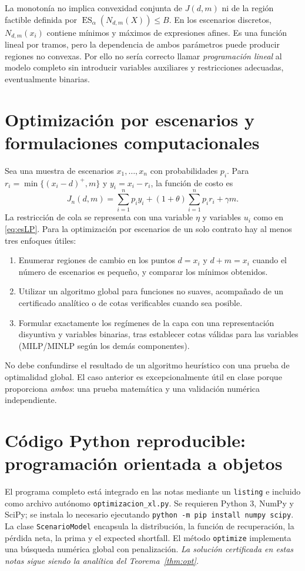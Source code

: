 \documentclass[11pt,reqno]{amsart}
\theoremstyle{definition}\newtheorem{definition}[theorem]{Definición}
\theoremstyle{remark}\newtheorem{remark}[theorem]{Observación}
\DeclareMathOperator{\ES}{ES}
\newcommand{\pos}[1]{(#1)^+}
\begin{document}
La monotonía no implica convexidad conjunta de $J(d,m)$ ni de la región factible definida por $\ES_\alpha(N_{d,m}(X))\le B$. En los escenarios discretos, $N_{d,m}(x_i)$ contiene mínimos y máximos de expresiones afines. Es una función lineal por tramos, pero la dependencia de ambos parámetros puede producir regiones no convexas. Por ello no sería correcto llamar \emph{programación lineal} al modelo completo sin introducir variables auxiliares y restricciones adecuadas, eventualmente binarias.

\section{Optimización por escenarios y formulaciones computacionales}
Sea una muestra de escenarios $x_1,\ldots,x_n$ con probabilidades $p_i$. Para $r_i=\min\{\pos{x_i-d},m\}$ y $y_i=x_i-r_i$, la función de costo es
\begin{equation}
J_n(d,m)=\sum_{i=1}^n p_i y_i+(1+\theta)\sum_{i=1}^n p_i r_i+\gamma m.
\end{equation}
La restricción de cola se representa con una variable $\eta$ y variables $u_i$ como en \eqref{eq:esLP}. Para la optimización por escenarios de un solo contrato hay al menos tres enfoques útiles:
\begin{enumerate}[label=(\roman*)]
\item Enumerar regiones de cambio en los puntos $d=x_i$ y $d+m=x_i$ cuando el número de escenarios es pequeño, y comparar los mínimos obtenidos.
\item Utilizar un algoritmo global para funciones no suaves, acompañado de un certificado analítico o de cotas verificables cuando sea posible.
\item Formular exactamente los regímenes de la capa con una representación disyuntiva y variables binarias, tras establecer cotas válidas para las variables (MILP/MINLP según los demás componentes).
\end{enumerate}
No debe confundirse el resultado de un algoritmo heurístico con una prueba de optimalidad global. El caso anterior es excepcionalmente útil en clase porque proporciona \emph{ambos}: una prueba matemática y una validación numérica independiente.

\section{Código Python reproducible: programación orientada a objetos}
El programa completo está integrado en las notas mediante un \texttt{listing} e incluido como archivo autónomo \texttt{optimizacion\_xl.py}. Se requieren Python 3, NumPy y SciPy; se instala lo necesario ejecutando \texttt{python -m pip install numpy scipy}. La clase \texttt{ScenarioModel} encapsula la distribución, la función de recuperación, la pérdida neta, la prima y el expected shortfall. El método \texttt{optimize} implementa una búsqueda numérica global con penalización. \emph{La solución certificada en estas notas sigue siendo la analítica del Teorema~\ref{thm:opt}.}
\end{document}
